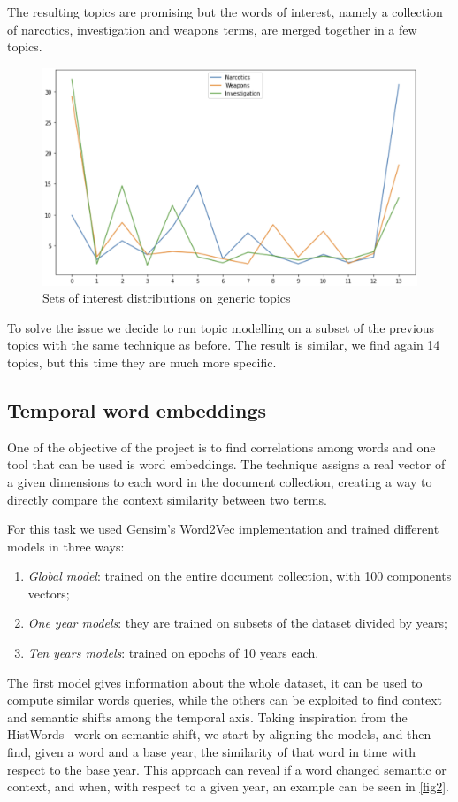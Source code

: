 The resulting topics are promising but the words of interest, namely a collection 
of narcotics, investigation and weapons terms, are merged together in a few topics.
\begin{figure}
\includegraphics[width=\textwidth]{images/topic_distribution.png}
\caption{Sets of interest distributions on generic topics} \label{fig1}
\end{figure}
To solve the issue we decide to run topic modelling on a subset of the previous 
topics with the same technique as before. The result is similar, we find again 14 topics, 
but this time they are much more specific.

\subsection{Temporal word embeddings}

One of the objective of the project is to find correlations among words and one tool 
that can be used is word embeddings. The technique assigns a real vector of a given dimensions
to each word in the document collection, creating a way to directly compare the context 
similarity between two terms.

For this task we used Gensim's Word2Vec implementation and trained different models 
in three ways:
\begin{enumerate}
    \item \emph{Global model}: trained on the entire document collection, with 100 components vectors;
    \item \emph{One year models}: they are trained on subsets of the dataset divided by years;
    \item \emph{Ten years models}: trained on epochs of 10 years each.
\end{enumerate}
The first model gives information about the whole dataset, it can be used to compute 
similar words queries, while the others can be exploited to find context and semantic shifts 
among the temporal axis.
Taking inspiration from the HistWords~\cite{hist-words} work on semantic shift, we start by aligning the models, 
and then find, given a word and a base year, the similarity of that word in time with respect 
to the base year. This approach can reveal if a word changed semantic or context, and when, 
with respect to a given year, an example can be seen in \vref{fig2}.

